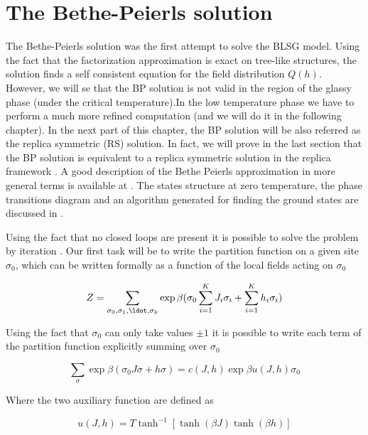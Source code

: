 \chapter{The Bethe-Peierls solution}

The Bethe-Peierls solution was the first attempt to solve the BLSG model. Using the fact that the factorization approximation is exact on tree-like structures, the solution finds a self consistent equation for the field distribution $Q(h)$. However, we will se that the BP solution is not valid in the region of the glassy phase (under the critical temperature).In the low temperature phase we have to perform a much more refined computation (and we will do it in the following chapter).
In the next part of this chapter, the BP solution will be also referred as the replica symmetric (RS) solution. In fact, we will prove in the last section that the BP solution is equivalent to a replica symmetric solution in the replica framework \cite{bethe}.
A good description of the Bethe Peierls approximation in more general terms is available at \cite{montanari}.
The states structure at zero temperature, the phase transitions diagram and an algorithm generated for finding the ground states are discussed in \cite{tersenghi}.

Using the fact that no closed loops are present it is possible to solve
the problem by iteration \cite{hans}.
Our first task will be to write the partition function on a given site $\sigma_0$, which can be written formally as
a function of the local fields acting on $\sigma_0$

\begin{equation}
Z = \sum_{\sigma_0,\sigma_1,\ldot,\sigma_k} \exp{\beta( \sigma_0 \sum_{i=1}^{K} J_i \sigma_i + \sum_{i=1}^{K}h_i \sigma_i )}
\label{partition}
\end{equation}

Using the fact that $\sigma_0$ can only take values ${\pm1}$ it is possible to write each term of the partition function explicitly summing over $\sigma_0$

\begin{equation}
\sum_{ \sigma} \exp{ \beta ( \sigma_0 J \sigma + h \sigma)} = c(J,h)\exp{\beta u(J,h) \sigma_0}
\label{u}
\end{equation}

Where the two auxiliary function are defined as

\begin{equation}
u(J,h) = T \tanh^{-1}[\tanh(\beta J)\tanh(\beta h)]
\end{equation}

